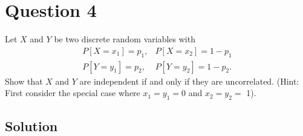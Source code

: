 \section*{Question 4}

Let \( X \) and \( Y \) be two discrete random variables with
\begin{align*}
    P\left[X=x_{1}\right]=p_{1}, & P\left[X=x_{2}\right]=1-p_{1}   \\
    P\left[Y=y_{1}\right]=p_{2}, & P\left[Y=y_{2}\right]=1-p_{2} .
\end{align*}
Show that \( X \) and \( Y \) are independent if and only if they are uncorrelated.
(Hint: First consider the special case where \( x_{1}=y_{1}=0 \) and \( x_{2}=y_{2}= \) 1).

\subsection*{Solution}
